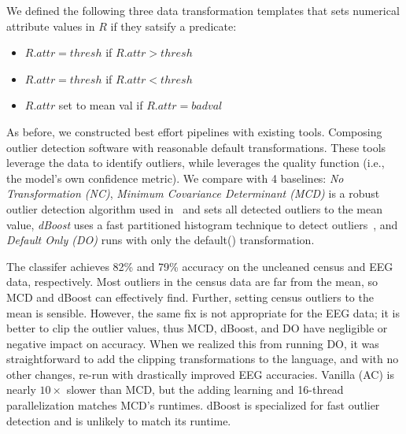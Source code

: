 We defined the following three data transformation templates that sets numerical attribute values in $R$ if they satsify a predicate:

{\small
\begin{itemize}[leftmargin=*, topsep=0mm, itemsep=0mm]
  \item {} $R.attr = thresh$ if $R.attr>thresh$
  \item {} $R.attr = thresh$ if $R.attr<thresh$
  \item {} $R.attr$ set to mean val if $R.attr=badval$
\end{itemize}
}

 As before, we constructed best effort pipelines with existing tools. Composing outlier detection software with reasonable default transformations. These tools leverage the data to identify outliers, while \sys leverages the quality function (i.e., the model's own confidence metric).
We compare with 4 baselines: {\it No Transformation (NC)}, {\it Minimum Covariance Determinant (MCD)} is a robust outlier detection algorithm used in~\cite{bailis2016macrobase} and sets all detected outliers to the mean value, {\it dBoost} uses a fast partitioned histogram technique to detect outliers~\cite{mariet2016outlier}, and {\it Default Only (DO)} runs \sys with only the \textsf{default()} transformation.  

 The classifer achieves 82\% and 79\% accuracy on the uncleaned census and EEG data, respectively.  Most outliers in the census data are far from the mean, so MCD and dBoost can effectively find.  Further, setting census outliers to the mean is sensible. However, the same fix is not appropriate for the EEG data; it is better to clip the outlier values, thus MCD, dBoost, and DO have negligible or negative impact on accuracy.  When we realized this from running DO, it was straightforward to add the clipping transformations to the language, and with no other changes, re-run \sys with drastically improved EEG accuracies.  
Vanilla \sys (AC) is nearly $10\times$ slower than MCD, but the adding learning and 16-thread parallelization  matches MCD's runtimes.  dBoost is specialized for fast outlier detection and \sys is unlikely to match its runtime.  


